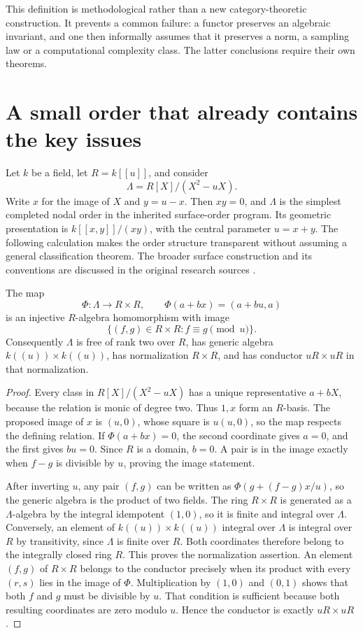 This definition is methodological rather than a new category-theoretic construction. It prevents a common failure: a functor preserves an algebraic invariant, and one then informally assumes that it preserves a norm, a sampling law or a computational complexity class. The latter conclusions require their own theorems.

\section{A small order that already contains the key issues}
Let $k$ be a field, let $R=k[[u]]$, and consider
\[
 \Lambda=R[X]/(X^2-uX).
\]
Write $x$ for the image of $X$ and $y=u-x$. Then $xy=0$, and $\Lambda$ is the simplest completed nodal order in the inherited surface-order program. Its geometric presentation is $k[[x,y]]/(xy)$, with the central parameter $u=x+y$. The following calculation makes the order structure transparent without assuming a general classification theorem. The broader surface construction and its conventions are discussed in the original research sources \cite{GRHRepo,SchreiberSurfaceI,SchreiberSurfaceII}.

\begin{proposition}
The map
\[
 \Phi:\Lambda\longrightarrow R\times R,\qquad
 \Phi(a+bx)=(a+bu,a)
\]
is an injective $R$-algebra homomorphism with image
\[
 \{(f,g)\in R\times R:f\equiv g\pmod u\}.
\]
Consequently $\Lambda$ is free of rank two over $R$, has generic algebra
$k((u))\times k((u))$, has normalization $R\times R$, and has conductor $uR\times uR$ in that normalization.
\end{proposition}
\begin{proof}
Every class in $R[X]/(X^2-uX)$ has a unique representative $a+bX$, because the relation is monic of degree two. Thus $1,x$ form an $R$-basis. The proposed image of $x$ is $(u,0)$, whose square is $u(u,0)$, so the map respects the defining relation. If $\Phi(a+bx)=0$, the second coordinate gives $a=0$, and the first gives $bu=0$. Since $R$ is a domain, $b=0$. A pair is in the image exactly when $f-g$ is divisible by $u$, proving the image statement.

After inverting $u$, any pair $(f,g)$ can be written as $\Phi(g+(f-g)x/u)$, so the generic algebra is the product of two fields. The ring $R\times R$ is generated as a $\Lambda$-algebra by the integral idempotent $(1,0)$, so it is finite and integral over $\Lambda$. Conversely, an element of $k((u))\times k((u))$ integral over $\Lambda$ is integral over $R$ by transitivity, since $\Lambda$ is finite over $R$. Both coordinates therefore belong to the integrally closed ring $R$. This proves the normalization assertion. An element $(f,g)$ of $R\times R$ belongs to the conductor precisely when its product with every $(r,s)$ lies in the image of $\Phi$. Multiplication by $(1,0)$ and $(0,1)$ shows that both $f$ and $g$ must be divisible by $u$. That condition is sufficient because both resulting coordinates are zero modulo $u$. Hence the conductor is exactly $uR\times uR$.
\end{proof}

